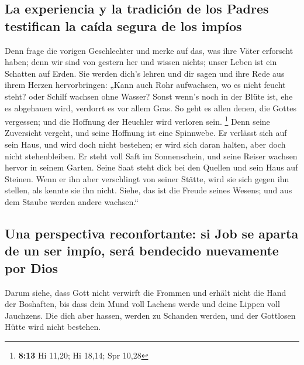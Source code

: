 \hypertarget{la-experiencia-y-la-tradiciuxf3n-de-los-padres-testifican-la-cauxedda-segura-de-los-impuxedos}{%
\subsection{La experiencia y la tradición de los Padres testifican la
caída segura de los
impíos}\label{la-experiencia-y-la-tradiciuxf3n-de-los-padres-testifican-la-cauxedda-segura-de-los-impuxedos}}

 Denn frage die vorigen Geschlechter und merke auf das,
was ihre Väter erforscht haben;  denn wir sind von gestern
her und wissen nichts; unser Leben ist ein Schatten auf Erden.
 Sie werden dich's lehren und dir sagen und ihre Rede aus
ihrem Herzen hervorbringen:  „Kann auch Rohr aufwachsen,
wo es nicht feucht steht? oder Schilf wachsen ohne Wasser?
 Sonst wenn's noch in der Blüte ist, ehe es abgehauen
wird, verdorrt es vor allem Gras.  So geht es allen
denen, die Gottes vergessen; und die Hoffnung der Heuchler wird verloren
sein. \footnote{\textbf{8:13} Hi 11,20; Hi 18,14; Spr 10,28}
 Denn seine Zuversicht vergeht, und seine Hoffnung ist
eine Spinnwebe.  Er verlässt sich auf sein Haus, und wird
doch nicht bestehen; er wird sich daran halten, aber doch nicht
stehenbleiben.  Er steht voll Saft im Sonnenschein, und
seine Reiser wachsen hervor in seinem Garten.  Seine Saat
steht dick bei den Quellen und sein Haus auf Steinen. 
Wenn er ihn aber verschlingt von seiner Stätte, wird sie sich gegen ihn
stellen, als kennte sie ihn nicht.  Siehe, das ist die
Freude seines Wesens; und aus dem Staube werden andere wachsen.``

\hypertarget{una-perspectiva-reconfortante-si-job-se-aparta-de-un-ser-impuxedo-seruxe1-bendecido-nuevamente-por-dios}{%
\subsection{Una perspectiva reconfortante: si Job se aparta de un ser
impío, será bendecido nuevamente por
Dios}\label{una-perspectiva-reconfortante-si-job-se-aparta-de-un-ser-impuxedo-seruxe1-bendecido-nuevamente-por-dios}}

 Darum siehe, dass Gott nicht verwirft die Frommen und
erhält nicht die Hand der Boshaften,  bis dass dein Mund
voll Lachens werde und deine Lippen voll Jauchzens.  Die
dich aber hassen, werden zu Schanden werden, und der Gottlosen Hütte
wird nicht bestehen.

